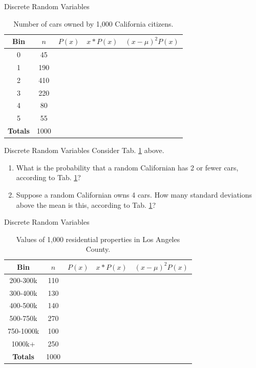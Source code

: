 \documentclass{beamer}
\begin{document}
\begin{frame}{Discrete Random Variables}
\small
\begin{table}
\centering
\begin{tabular}{| c | c | c | c | c |}
\hline
\hline
Bin & $n$ & $P(x)$ & $x*P(x)$ & $(x-\mu)^2 P(x)$ \\ \hline
0 & 45 & & & \\ \hline
1 & 190 & & & \\ \hline
2 & 410 & & & \\ \hline
3 & 220 & & & \\ \hline
4 & 80 & & & \\ \hline
5 & 55 & & & \\ \hline
\textbf{Totals} & 1000 & & & \\ \hline
\hline
\end{tabular}
\caption{\label{tab:cars} Number of cars owned by 1,000 California citizens.}
\end{table}
\end{frame}

\begin{frame}{Discrete Random Variables}
\small
Consider Tab. \ref{tab:cars} above.
\begin{enumerate}
\item What is the probability that a random Californian has 2 or fewer cars, according to Tab. \ref{tab:cars}?
\item Suppose a random Californian owns 4 cars.  How many standard deviations above the mean is this, according to Tab. \ref{tab:cars}?
\end{enumerate}
\end{frame}

\begin{frame}{Discrete Random Variables}
\small
\begin{table}
\centering
\begin{tabular}{| c | c | c | c | c |}
\hline
\hline
Bin & $n$ & $P(x)$ & $x*P(x)$ & $(x-\mu)^2 P(x)$ \\ \hline
200-300k & 110 & & & \\ \hline
300-400k & 130 & & & \\ \hline
400-500k & 140 & & & \\ \hline
500-750k & 270 & & & \\ \hline
750-1000k & 100 & & & \\ \hline
1000k+ & 250 & & & \\ \hline
\textbf{Totals} & 1000 & & & \\ \hline
\hline
\end{tabular}
\caption{\label{tab:homes} Values of 1,000 residential properties in Los Angeles County.}
\end{table}
\end{frame}
\end{document}
